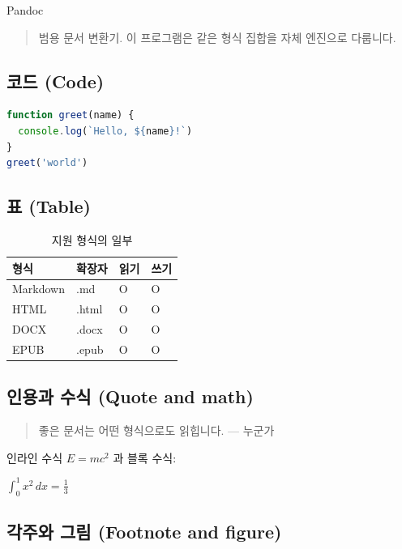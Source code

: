\documentclass[11pt]{article}
\begin{document}
\begin{description}
\item[Pandoc] 
\end{description}

\begin{quote}
범용 문서 변환기. 이 프로그램은 같은 형식 집합을 자체 엔진으로 다룹니다.
\end{quote}

\subsection*{코드 (Code)}\label{코드-code}

\begin{lstlisting}[language=js]
function greet(name) {
  console.log(`Hello, ${name}!`)
}
greet('world')
\end{lstlisting}

\subsection*{표 (Table)}\label{표-table}

\begin{table}[htbp]
\centering
\begin{tabular}{llll}
\toprule
형식 & 확장자 & 읽기 & 쓰기 \\
\midrule
Markdown & .md & O & O \\
HTML & .html & O & O \\
DOCX & .docx & O & O \\
EPUB & .epub & O & O \\
\bottomrule
\end{tabular}
\caption{지원 형식의 일부}
\end{table}

\subsection*{인용과 수식 (Quote and math)}\label{인용과-수식-quote-and-math}

\begin{quote}
좋은 문서는 어떤 형식으로도 읽힙니다. --- 누군가
\end{quote}

인라인 수식 $E = mc^2$ 과 블록 수식:

$\int_0^1 x^2\,dx = \frac{1}{3}$

\subsection*{각주와 그림 (Footnote and figure)}\label{각주와-그림-footnote-and-figure}
\end{document}
